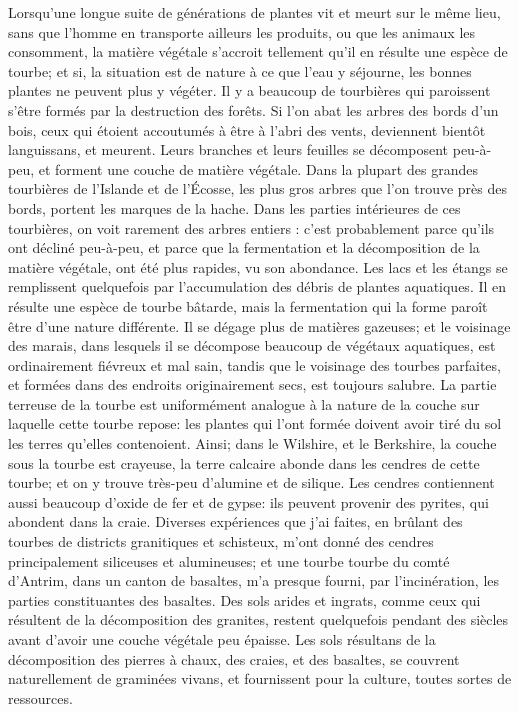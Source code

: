Lorsqu'une longue suite de générations de plantes vit et meurt sur le même lieu, sans que l'homme en transporte ailleurs les produits, ou que les animaux les consomment, la matière végétale s'accroit tellement qu'il en résulte une espèce de tourbe; et si, la situation est de nature à ce que l'eau y séjourne, les bonnes plantes ne peuvent plus y végéter.
Il y a beaucoup de tourbières qui paroissent s'être formés par la destruction des forêts. Si l'on abat les arbres des bords d'un bois, ceux qui étoient accoutumés à être à l'abri des vents, deviennent bientôt languissans, et meurent. Leurs branches et leurs feuilles se décomposent peu-à-peu, et forment une couche de matière végétale. Dans la plupart des grandes tourbières de l'Islande et de l'Écosse, les plus gros arbres que l'on trouve près des bords, portent les marques de la hache. Dans les parties intérieures de ces tourbières, on voit rarement des arbres entiers : c'est probablement parce qu'ils ont décliné peu-à-peu, et parce que la fermentation et la décomposition de la matière végétale, ont été plus rapides, vu son abondance.\setcounter{page}{470} Les lacs et les étangs se remplissent quelquefois par l’accumulation des débris de plantes aquatiques. Il en résulte une espèce de tourbe bâtarde, mais la fermentation qui la forme paroît être d’une nature différente. Il se dégage plus de matières gazeuses; et le voisinage des marais, dans lesquels il se décompose beaucoup de végétaux aquatiques, est ordinairement fiévreux et mal sain, tandis que le voisinage des tourbes parfaites, et formées dans des endroits originairement secs, est toujours salubre.
La partie terreuse de la tourbe est uniformément analogue à la nature de la couche sur laquelle cette tourbe repose: les plantes qui l’ont formée doivent avoir tiré du sol les terres qu’elles contenoient. Ainsi; dans le Wilshire, et le Berkshire, la couche sous la tourbe est crayeuse, la terre calcaire abonde dans les cendres de cette tourbe; et on y trouve très-peu d’alumine et de silique. Les cendres contiennent aussi beaucoup d’oxide de fer et de gypse: ils peuvent provenir des pyrites, qui abondent dans la craie.
Diverses expériences que j’ai faites, en brûlant des tourbes de districts granitiques et schisteux, m’ont donné des cendres principalement siliceuses et alumineuses; et une tourbe\setcounter{page}{471} tourbe du comté d'Antrim, dans un canton de basaltes, m'a presque fourni, par l'incinération, les parties constituantes des basaltes.
Des sols arides et ingrats, comme ceux qui résultent de la décomposition des granites, restent quelquefois pendant des siècles avant d'avoir une couche végétale peu épaisse. Les sols résultans de la décomposition des pierres à chaux, des craies, et des basaltes, se couvrent naturellement de graminées vivans, et fournissent pour la culture, toutes sortes de ressources.
